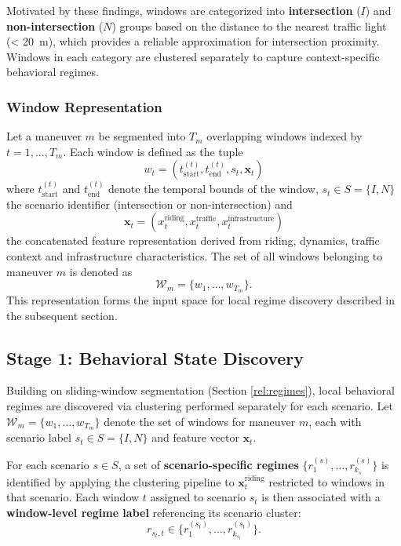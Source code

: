Motivated by these findings, windows are categorized into \textbf{intersection} ($I$) and \textbf{non-intersection} ($N$) groups based on the distance to the nearest traffic light (< 20~m), which provides a reliable approximation for intersection proximity. Windows in each category are clustered separately to capture context-specific behavioral regimes. 


\subsubsection{Window Representation}
Let a maneuver $m$ be segmented into $T_m$ overlapping windows indexed by $t = 1, \ldots,T_m$.
Each window is defined as the tuple
$$w_t = \left(t_\text{start}^{(t)}, t_\text{end}^{(t)}, s_t, \mathbf{x}_t\right)$$
where $t_\text{start}^{(t)}$ and $t_\text{end}^{(t)}$ denote the temporal bounds of the window, $s_t\in S = \{I,N\}$ the scenario identifier (intersection or non-intersection) and 
$$\mathbf{x}_t = \left(x_t^\text{riding}, x_t^\text{traffic}, x_t^\text{infrastructure}\right)$$
the concatenated feature representation derived from riding, dynamics, traffic context and infrastructure characteristics.
The set of all windows belonging to maneuver $m$ is denoted as
$$\mathcal{W}_m=\{w_1, \ldots,w_{T_m}\}.$$
This representation forms the input space for local regime discovery described in the subsequent section.


\subsection{Stage 1: Behavioral State Discovery}
\label{meth:level1}

Building on sliding-window segmentation (Section \ref{rel:regimes}), local behavioral regimes are discovered via clustering performed separately for each scenario. Let $\mathcal{W}_m = \{w_1, \dots, w_{T_m}\}$ denote the set of windows for maneuver $m$, each with scenario label $s_t \in S = \{I, N\}$ and feature vector $\mathbf{x}_t$.  

For each scenario $s \in S$, a set of \textbf{scenario-specific regimes} $\{r^{(s)}_1, \dots, r^{(s)}_{k_s}\}$ is identified by applying the clustering pipeline to $\mathbf{x}_t^\text{riding}$ restricted to windows in that scenario. Each window $t$ assigned to scenario $s_t$ is then associated with a \textbf{window-level regime label} referencing its scenario cluster:
\[
r_{s_t,t} \in \{ r^{(s_t)}_1, \dots, r^{(s_t)}_{k_{s_t}} \}.
\]  

